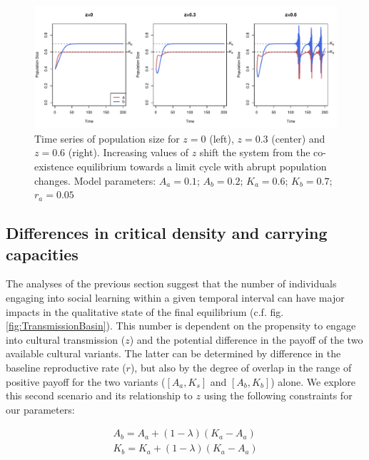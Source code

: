 \documentclass[review,authoryear]{elsarticle}
\begin{document}
\begin{figure}
  \centering
      \includegraphics[width=1\textwidth]{./figures/figure4b.pdf}
  \caption{Time series of population size for $z=0$ (left), $z=0.3$ (center) and $z=0.6$ (right). Increasing values of $z$ shift the system from the co-existence equilibrium towards a limit cycle with abrupt population changes. Model parameters: $A_a=0.1$; $A_b=0.2$; $K_a=0.6$; $K_b=0.7$; $r_a=0.05$}
    \label{fig:TSsocialLearning}
\end{figure}

\subsection{Differences in critical density and carrying capacities}

The analyses of the previous section suggest that the number of individuals engaging into social learning within a given temporal interval can have major impacts in the qualitative state of the final equilibrium (c.f. fig. \ref{fig:TransmissionBasin}). This number is dependent on the propensity to engage into cultural transmission ($z$) and the potential difference in the payoff of the two available cultural variants. The latter can be determined by difference in the baseline reproductive rate ($r$), but also by the degree of overlap in the range of positive payoff for the two variants ($[A_a,K_s]$ and $[A_b,K_b]$) alone. We explore this second scenario and its relationship to $z$ using the following constraints for our parameters:

\begin{equation}
\begin{aligned}
\label{eqOverlap}
A_b = A_a + (1-\lambda)(K_a-A_a)\\
K_b = K_a + (1-\lambda)(K_a-A_a)
\end{aligned}
\end{equation}
\end{document}
